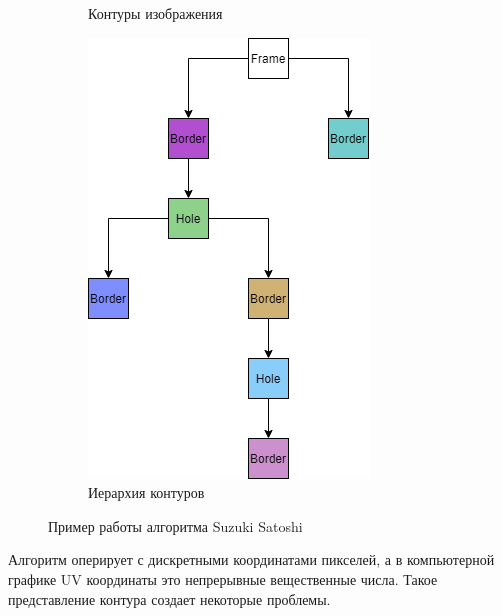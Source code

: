\documentclass{fefu_thesis/cls/fefu}
\begin{document}
\begin{figure}[H]
\begin{subfigure}[t]{.49\linewidth}
            \caption{Контуры изображения}
        \end{subfigure}
        \begin{subfigure}[t]{.99\linewidth}
            \centering
            \includegraphics[scale=0.7]{images/SuzukiExample_hierarchy.png}
            \caption{Иерархия контуров}
        \end{subfigure}
        \caption{Пример работы алгоритма Suzuki Satoshi}
    \end{figure}

    Алгоритм оперирует с дискретными координатами пикселей, а в компьютерной графике UV координаты это непрерывные вещественные числа. Такое представление контура создает некоторые проблемы.
\end{document}
